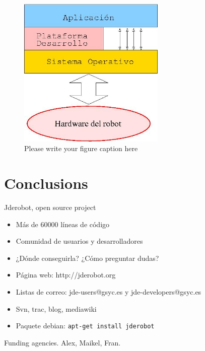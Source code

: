 \documentclass[twocolumn]{svjour3}          %
\begin{document}
\begin{figure}
  \includegraphics[width=7cm]{figs/programacion3.jpg}
\caption{Please write your figure caption here}
\label{fig:2}       %
\end{figure}


\section{Conclusions}

Jderobot, open source project
\begin{itemize}
\item Más de 60000 líneas de código
\item Comunidad de usuarios y desarrolladores
\item ¿Dónde conseguirla? ¿Cómo preguntar dudas? 
\item Página web: {http://jderobot.org}
\item Listas de correo: jde-users@gsyc.es y jde-developers@gsyc.es
\item Svn, trac, blog, mediawiki
\item Paquete debian: \texttt{apt-get install jderobot}
\end{itemize}

\begin{acknowledgements}
Funding agencies. Alex, Maikel, Fran.
\end{acknowledgements}

\end{document}
